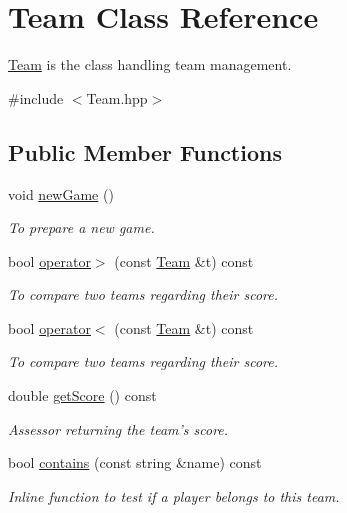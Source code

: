 \hypertarget{classTeam}{\section{Team Class Reference}
\label{classTeam}
}


\hyperlink{classTeam}{Team} is the class handling team management.  




{\ttfamily \#include $<$Team.\-hpp$>$}

\subsection*{Public Member Functions}
\begin{DoxyCompactItemize}
\item 
\hypertarget{classTeam_af7fdc812a83e0e8c0bb24bc1c50b30ca}{void \hyperlink{classTeam_af7fdc812a83e0e8c0bb24bc1c50b30ca}{new\-Game} ()}\label{classTeam_af7fdc812a83e0e8c0bb24bc1c50b30ca}

\begin{DoxyCompactList}\small\item\em To prepare a new game. \end{DoxyCompactList}\item 
\hypertarget{classTeam_a3164302f1fd5d70db2e85994488f8054}{bool \hyperlink{classTeam_a3164302f1fd5d70db2e85994488f8054}{operator$>$} (const \hyperlink{classTeam}{Team} \&t) const }\label{classTeam_a3164302f1fd5d70db2e85994488f8054}

\begin{DoxyCompactList}\small\item\em To compare two teams regarding their score. \end{DoxyCompactList}\item 
\hypertarget{classTeam_a1811d6b7e660181d8209b455cb9d92e0}{bool \hyperlink{classTeam_a1811d6b7e660181d8209b455cb9d92e0}{operator$<$} (const \hyperlink{classTeam}{Team} \&t) const }\label{classTeam_a1811d6b7e660181d8209b455cb9d92e0}

\begin{DoxyCompactList}\small\item\em To compare two teams regarding their score. \end{DoxyCompactList}\item 
\hypertarget{classTeam_a57a775ba38aaf35510e412a01d6a3062}{double \hyperlink{classTeam_a57a775ba38aaf35510e412a01d6a3062}{get\-Score} () const }\label{classTeam_a57a775ba38aaf35510e412a01d6a3062}

\begin{DoxyCompactList}\small\item\em Assessor returning the team's score. \end{DoxyCompactList}\item 
bool \hyperlink{classTeam_ae3bc7f55a2204019bf393ccd110ce873}{contains} (const string \&name) const 
\begin{DoxyCompactList}\small\item\em Inline function to test if a player belongs to this team. \end{DoxyCompactList}\end{DoxyCompactItemize}
